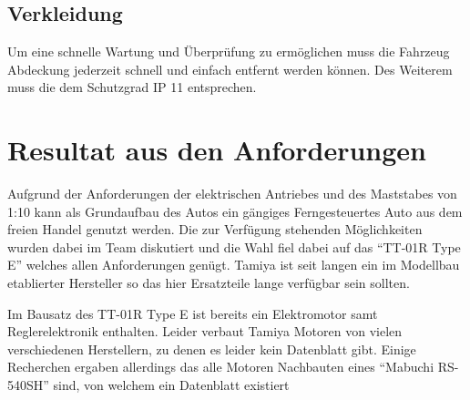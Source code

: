 \subsection{Verkleidung}
Um eine schnelle Wartung und Überprüfung zu ermöglichen muss die Fahrzeug Abdeckung jederzeit schnell und einfach entfernt werden können. Des Weiterem muss die dem 
Schutzgrad IP 11 entsprechen.


\section{Resultat aus den Anforderungen}
Aufgrund der Anforderungen der elektrischen Antriebes und des Maststabes von 1:10 kann als Grundaufbau des Autos ein gängiges Ferngesteuertes Auto aus dem
freien Handel genutzt werden. Die zur Verfügung stehenden Möglichkeiten wurden dabei im Team diskutiert und die Wahl fiel dabei auf das ``TT-01R Type E'' welches
allen Anforderungen genügt. Tamiya ist seit langen ein im Modellbau etablierter Hersteller so das hier Ersatzteile lange verfügbar sein sollten.

Im Bausatz des TT-01R Type E ist bereits ein Elektromotor samt Reglerelektronik enthalten. Leider verbaut Tamiya Motoren von vielen verschiedenen Herstellern,
zu denen es leider kein Datenblatt gibt. Einige Recherchen ergaben allerdings das alle Motoren Nachbauten eines ``Mabuchi RS-540SH'' sind, von welchem ein Datenblatt
existiert \cite{Mabuchi}


